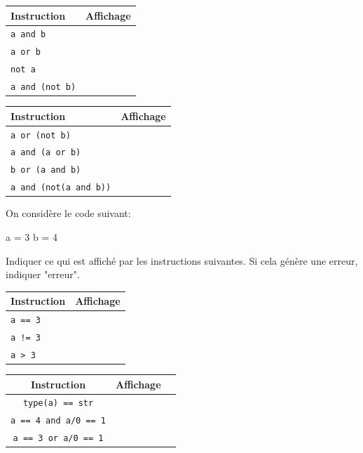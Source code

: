\documentclass[a4paper,10pt]{report}
\renewcommand{\arraystretch}{1}  %
\def\ptsexoF{1}
\begin{document}
\renewcommand{\arraystretch}{1.2}
    \begin{tabular}{|p{4cm}|p{3cm}|}
        \hline
         Instruction & Affichage\\ \hline
         \verb|a and b|&\\\hline
        \verb|a or b| &\\\hline
        \verb|not a| &\\\hline
        \verb|a and (not b)|&\\\hline
        
        
    \end{tabular}\hfill
\renewcommand{\arraystretch}{1.2}
    \begin{tabular}{|p{4cm}|p{3cm}|}
        \hline
         Instruction & Affichage\\ \hline
        \verb|a or (not b)| &\\\hline
        \verb|a and (a or b)|&\\\hline
        \verb|b or (a and b)|&\\\hline
        \verb|a and (not(a and b))|&\\\hline
    \end{tabular}
\bigskip


\exods{\ptsexoF}

On considère le code suivant:

\begin{CodePythontexAlt}[TaillePolice=\large,Largeur=1\linewidth,Centre,PremLigne=1]{}
a = 3
b = 4
\end{CodePythontexAlt}


Indiquer ce qui est affiché par les instructions suivantes. Si cela génère une erreur, indiquer "erreur".

\renewcommand{\arraystretch}{1.2}
    \begin{tabular}{|p{4cm}|p{3cm}|}
        \hline
         Instruction & Affichage\\ \hline
         \verb|a == 3|&\\\hline
        \verb|a != 3| &\\\hline
        \verb|a > 3| &\\\hline
        
        
        
    \end{tabular}\hfill
\renewcommand{\arraystretch}{1.2}
    \begin{tabular}{|c|p{4cm}|p{3cm}|}
        \hline
         Instruction & Affichage\\ \hline
        \verb|type(a) == str|&\\\hline
        \verb|a == 4 and a/0 == 1|&\\\hline
        \verb|a == 3 or a/0 == 1| &\\\hline
         \end{tabular}
\bigskip
\end{document}

